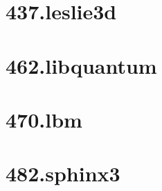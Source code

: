 \newpage
\section*{437.leslie3d}


\newpage
\section*{462.libquantum}


\newpage
\section*{470.lbm}


\newpage
\section*{482.sphinx3}

